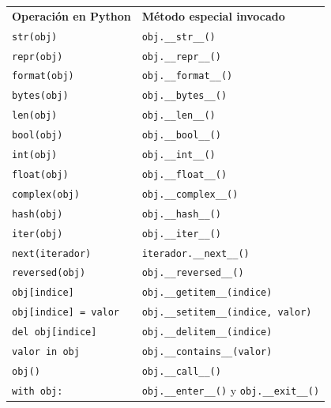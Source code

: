 \documentclass[11pt,a5paper,twoside]{book}
\begin{document}
\begin{tcolorbox}
\begin{tabular}{ll}
 \textbf{Operación en Python}    &  \textbf{Método especial invocado}              \\
 {\scriptsize \texttt{str(obj)}}             &  {\scriptsize \texttt{obj.\_\_str\_\_()}}                       \\
 {\scriptsize \texttt{repr(obj)}}            &  {\scriptsize \texttt{obj.\_\_repr\_\_()}}                      \\
 {\scriptsize \texttt{format(obj)}}          &  {\scriptsize \texttt{obj.\_\_format\_\_()}}                    \\
 {\scriptsize \texttt{bytes(obj)}}           &  {\scriptsize \texttt{obj.\_\_bytes\_\_()}}                     \\
 {\scriptsize \texttt{len(obj)}}             &  {\scriptsize \texttt{obj.\_\_len\_\_()}}                       \\
 {\scriptsize \texttt{bool(obj)}}            &  {\scriptsize \texttt{obj.\_\_bool\_\_()}}                      \\
 {\scriptsize \texttt{int(obj)}}             &  {\scriptsize \texttt{obj.\_\_int\_\_()}}                       \\
 {\scriptsize \texttt{float(obj)}}           &  {\scriptsize \texttt{obj.\_\_float\_\_()}}                     \\
 {\scriptsize \texttt{complex(obj)}}         &  {\scriptsize \texttt{obj.\_\_complex\_\_()}}                   \\
 {\scriptsize \texttt{hash(obj)}}            &  {\scriptsize \texttt{obj.\_\_hash\_\_()}}                      \\
 {\scriptsize \texttt{iter(obj)}}            &  {\scriptsize \texttt{obj.\_\_iter\_\_()}}                      \\
 {\scriptsize \texttt{next(iterador)}}       &  {\scriptsize \texttt{iterador.\_\_next\_\_()}}                 \\
 {\scriptsize \texttt{reversed(obj)}}        &  {\scriptsize \texttt{obj.\_\_reversed\_\_()}}                  \\
 {\scriptsize \texttt{obj[indice]}}          &  {\scriptsize \texttt{obj.\_\_getitem\_\_(indice)}}             \\
 {\scriptsize \texttt{obj[indice] = valor}}  &  {\scriptsize \texttt{obj.\_\_setitem\_\_(indice, valor)}}      \\
 {\scriptsize \texttt{del obj[indice]}}      &  {\scriptsize \texttt{obj.\_\_delitem\_\_(indice)}}             \\
 {\scriptsize \texttt{valor in obj}}         &  {\scriptsize \texttt{obj.\_\_contains\_\_(valor)}}             \\
 {\scriptsize \texttt{obj()}}                &  {\scriptsize \texttt{obj.\_\_call\_\_()}}                      \\
 {\scriptsize \texttt{with obj:}}            &  {\scriptsize \texttt{obj.\_\_enter\_\_()}} y {\scriptsize \texttt{obj.\_\_exit\_\_()}}  \\
\end{tabular}
\end{tcolorbox}
\end{document}
